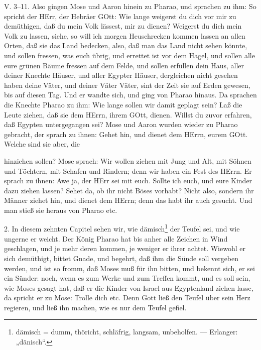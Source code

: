 \begin{schriftzitat}
V. 3–11. Also gingen Mose und Aaron hinein zu Pharao, und sprachen zu ihm: So spricht der HErr, der Hebräer GOtt: Wie lange weigerst du dich vor mir zu demüthigen, daß du mein Volk lässest, mir zu dienen? Weigerst du dich mein Volk zu lassen, siehe, so will ich morgen Heuschrecken kommen lassen an allen Orten, daß sie das Land bedecken, also, daß man das Land nicht sehen könnte, und sollen fressen, was euch übrig, und errettet ist vor dem Hagel, und sollen alle eure grünen Bäume fressen auf dem Felde, und sollen erfüllen dein Haus, aller deiner Knechte Häuser, und aller Egypter Häuser, dergleichen nicht gesehen haben deine Väter, und deiner Väter Väter, sint der Zeit sie auf Erden gewesen, bis auf diesen Tag. Und er wandte sich, und ging von Pharao hinaus. Da sprachen die Knechte Pharao zu ihm: Wie lange sollen wir damit geplagt sein? Laß die Leute ziehen, daß sie dem HErrn, ihrem GOtt, dienen. Willst du zuvor erfahren, daß Egypten untergegangen sei? Mose und Aaron wurden wieder zu Pharao gebracht, der sprach zu ihnen: Gehet hin, und dienet dem HErrn, eurem GOtt. Welche sind sie aber, die
\end{schriftzitat}

hinziehen sollen? Mose sprach: Wir wollen ziehen mit Jung und Alt, mit Söhnen und Töchtern, mit Schafen und Rindern; denn wir haben ein Fest des HErrn. Er sprach zu ihnen: Awe ja, der HErr sei mit euch. Sollte ich euch, und eure Kinder dazu ziehen lassen? Sehet da, ob ihr nicht Böses vorhabt? Nicht also, sondern ihr Männer ziehet hin, und dienet dem HErrn; denn das habt ihr auch gesucht. Und man stieß sie heraus von Pharao etc.

2. In diesem zehnten Capitel sehen wir, wie dämisch\footnote{dämisch = dumm, thöricht, schläfrig, langsam, unbeholfen. — Erlanger: „dänisch“.} der Teufel sei, und wie ungerne er weicht. Der König Pharao hat bis anher alle Zeichen in Wind geschlagen, und je mehr deren kommen, je weniger er ihrer achtet. Wiewohl er sich demüthigt, bittet Gnade, und begehrt, daß ihm die Sünde soll vergeben werden, und ist so fromm, daß Moses muß für ihn bitten, und bekennt sich, er sei ein Sünder: noch, wenn es zum Werke und zum Treffen kommt, und es soll sein, wie Moses gesagt hat, daß er die Kinder von Israel aus Egyptenland ziehen lasse, da spricht er zu Mose: Trolle dich etc. Denn Gott ließ den Teufel über sein Herz regieren, und ließ ihn machen, wie es nur dem Teufel gefiel.

